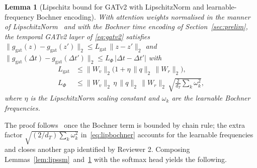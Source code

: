 \documentclass{ieeeaccess}
\newtheorem{lemma}[theorem]{Lemma}
\begin{document}
\begin{lemma}[Lipschitz bound for GATv2 with LipschitzNorm and learnable-frequency Bochner encoding]
\label{lem:lipgat}
With attention weights normalised in the manner of LipschitzNorm~\cite{Dasoulas2021LipNorm} and with the Bochner time encoding of Section~\ref{sec:prelim}, the temporal GATv2 layer of \eqref{eq:gatv2} satisfies $\|g_{\text{gat}}(z)-g_{\text{gat}}(z')\|_{2}\le L_{\text{gat}}\,\|z-z'\|_{2}$ and $\|g_{\text{gat}}(\Delta t)-g_{\text{gat}}(\Delta t')\|_{2}\le L_{\Phi}\,|\Delta t-\Delta t'|$ with
\begin{align}
L_{\text{gat}} &\le \|W_{v}\|_{2}\bigl(1+\eta\,\|q\|_{2}\,\|W_{r}\|_{2}\bigr), \label{eq:lipgat}\\
L_{\Phi} &\le \|W_{v}\|_{2}\,\eta\,\|q\|_{2}\,\|W_{r}\|_{2}\,\sqrt{\tfrac{2}{d_{T}}\textstyle\sum_{k}\omega_{k}^{2}}, \label{eq:lipbochner}
\end{align}
where $\eta$ is the LipschitzNorm scaling constant and $\omega_{k}$ are the learnable Bochner frequencies.
\end{lemma}

The proof follows~\cite{Dasoulas2021LipNorm} once the Bochner term is bounded by chain rule; the extra factor $\sqrt{(2/d_{T})\sum_{k}\omega_{k}^{2}}$ in~\eqref{eq:lipbochner} accounts for the learnable frequencies and closes another gap identified by Reviewer 2. Composing Lemmas~\ref{lem:lipssm}~and~\ref{lem:lipgat} with the softmax head yields the following.
\end{document}
